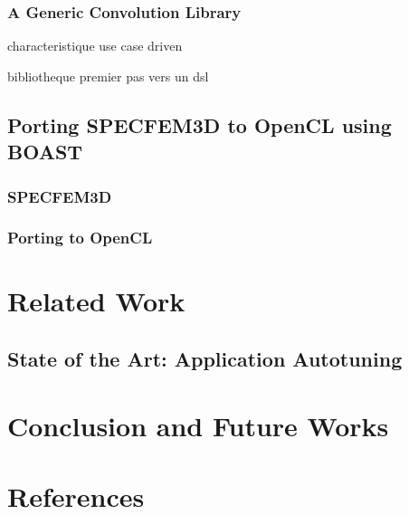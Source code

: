 \documentclass[review]{elsarticle}
\begin{document}
    \subsubsection{A Generic Convolution Library}

  characteristique use case driven

  bibliotheque premier pas vers un dsl

  \subsection{Porting SPECFEM3D to OpenCL using BOAST}

    \subsubsection{SPECFEM3D}

    \subsubsection{Porting to OpenCL}

\section{Related Work}

  \subsection{State of the Art: Application Autotuning}


\section{Conclusion and Future Works}


\section*{References}


\end{document}
